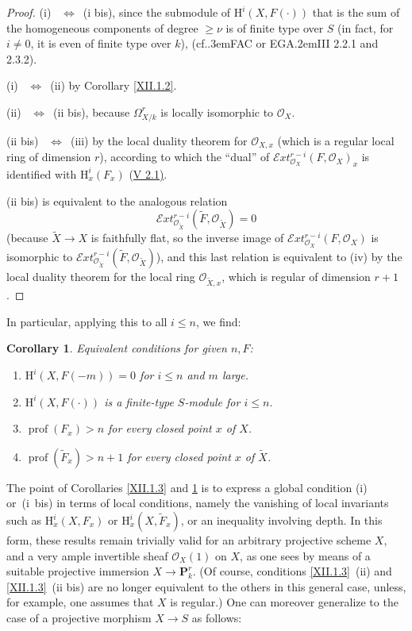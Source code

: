 \documentclass[11pt,a4paper,oneside]{book}
\providecommand{\sisi}[2]{#2}
\providecommand{\pageoriginale}{%
  \refstepcounter{pageoriginal}%
  \marginpar{\raggedright\footnotesize\bfseries\thepageoriginal}%
  \xspace}
\providecommand{\og}{``}
\providecommand{\fg}{''\xspace}
\providecommand{\cf}{cf.\kern.3em}
\providecommand{\EGA}{\textup{EGA}\kern.2em}
\providecommand{\Oo}{\mathcal O}
\providecommand{\PP}{\mathbf P}
\providecommand{\SheafExt}{\mathcal E\!xt}
\providecommand{\OX}{\mathcal O_X}
\providecommand{\OXx}{\mathcal O_{X,x}}
\providecommand{\prof}{\operatorname{prof}}
\renewcommand{\H}{\mathrm H}
\providecommand{\SSI}{\unskip~$\Longleftrightarrow$~\ignorespaces}
\providecommand{\skipqed}{\renewcommand{\qedsymbol}{}}
\newenvironment{enumeratei}
  {\begin{enumerate}[label=(\roman*)]}
  {\end{enumerate}}
\theoremstyle{plain}
\newtheorem{corollaire}[subsection]{Corollary}
\theoremstyle{definition}
\theoremstyle{remark}
\renewcommand{\Ref}[1]{\textup{\ref{#1}}}
\begin{document}
\begin{proof}
(i) \SSI (i bis), since the submodule of $\H^i(X, F(\cdot))$ that is the sum of the homogeneous components of degree $\geq \nu$ is of finite type over $S$ (in fact, for $i\neq 0$, it is even of finite type over $k$), (\cf FAC or \EGA III 2.2.1 and 2.3.2).

(i) \SSI (ii) by Corollary \Ref{XII.1.2}.

(ii) \SSI (ii bis), because $\Omega_{X/k}^r$ is locally isomorphic to $\OX$.

(ii bis) \SSI (iii) by the local duality theorem for $\OXx$ (which is a regular\pageoriginale local ring of dimension $r$), according to which the \og dual\fg of $\SheafExt^{r-i}_{\OX}(F, \OX)_x$ is identified with $\H^i_x(F_x)$ (\hyperref[V.2.1]{V 2.1)}.

(ii bis) is equivalent to the analogous relation
\[
\SheafExt^{r-i}_{\Oo_{\widetilde{X}}}(\widetilde{F}, \Oo_{\widetilde{X}})=0
\]
(because $\widetilde{X}\to X$ is faithfully flat, so the inverse image of $\SheafExt^{r-i}_{\OX}(F, \OX)$ is isomorphic to $\SheafExt^{r-i}_{\Oo_{\widetilde{X}}}(\widetilde{F}, \Oo_{\widetilde{X}})$), and this last relation is equivalent to (iv) by the local duality theorem for the local ring $\Oo_{\widetilde{X},x}$, which is regular of dimension $r+1$.
\skipqed
\end{proof}

In particular, applying this to all $i\leq n$, we find:

\begin{corollaire} \label{XII.1.4}
Equivalent conditions for given $n,F$:
\begin{enumeratei}
\item
$\H^i(X, F(-m))=0$ for $i\leq n$ and $m$ large.
\item[\textup{(i bis)}] $\H^i(X, F(\cdot))$ is a finite-type $S$-module for $i\leq n$.
\item
$\prof(F_x)>n$ for every closed point $x$ of $X$.
\item
$\prof(\widetilde{F}_x)>n+1$ for every closed point $x$ of $\widetilde{X}$.
\end{enumeratei}
\end{corollaire}

The point of Corollaries \Ref{XII.1.3} and \Ref{XII.1.4} is to express a global condition (i) or~(i~bis) in terms of local conditions, \sisi{\ignorespaces}{namely} the vanishing of local invariants such as $\H_x^i(X, F_x)$ or $\H_x^i(X, \widetilde{F}_x)$, or an inequality involving depth. In this form, these results remain trivially valid for an arbitrary projective scheme $X$, and a very ample invertible sheaf $\OX(1)$ on $X$, as one sees by means of a suitable projective immersion $X\to\PP_k^r$. (Of course, conditions \Ref{XII.1.3}~(ii) and \Ref{XII.1.3}~(ii bis) are no longer equivalent to the others in this general case, unless, for example, one assumes that $X$ is regular.) One can moreover generalize to the case of a projective morphism $X\to S$ as follows:
\end{document}
